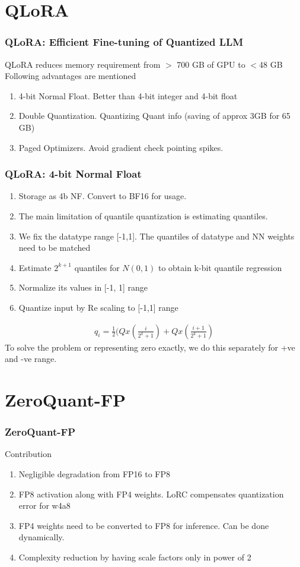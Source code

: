 \documentclass{beamer}
\theoremstyle{plain}
\theoremstyle{definition}
\theoremstyle{remark}
\numberwithin{equation}{section}
\numberwithin{figure}{section}
\numberwithin{theorem}{section}
\begin{document}
\section{QLoRA}
\begin{frame}
\frametitle{QLoRA: Efficient Fine-tuning of Quantized LLM}
QLoRA reduces memory requirement from $>$ 700 GB of GPU to $<$48 GB
Following advantages are mentioned
\begin{enumerate}
    \item 4-bit Normal Float. Better than 4-bit integer and 4-bit float
    \item Double Quantization. Quantizing Quant info (saving of approx 3GB for 65 GB)
    \item Paged Optimizers. Avoid gradient check pointing spikes.
\end{enumerate}
\end{frame}

\begin{frame}[shrink]
    \frametitle{QLoRA: 4-bit Normal Float}
    \begin{enumerate}
        \item Storage as 4b NF. Convert to BF16 for usage.
        \item The main limitation of quantile quantization is estimating quantiles.
        \item We fix the datatype range [-1,1]. The quantiles of datatype and NN weights need to be matched
        \item Estimate $2^{k+1}$ quantiles for $N(0,1)$ to obtain k-bit quantile regression
        \item Normalize its values in [-1, 1] range
        \item Quantize input by Re scaling to [-1,1] range
    \end{enumerate}                        

    \begin{align}
        q_i = \frac{1}{2} (Qx(\frac{i}{2^k+1}) + Qx(\frac{i+1}{2^k+1})    
    \end{align}
    To solve the problem or representing zero exactly, we do this separately for +ve and -ve range.
\end{frame}                        


\section{ZeroQuant-FP}
\begin{frame}
\frametitle{ZeroQuant-FP}
Contribution
\begin{enumerate}
    \item Negligible degradation from FP16 to FP8
    \item FP8 activation along with FP4 weights. LoRC compensates quantization error for w4a8
    \item FP4 weights need to be converted to FP8 for inference. Can be done dynamically. 
    \item Complexity reduction by having scale factors only in power of 2
\end{enumerate}
\end{frame}
\end{document}
